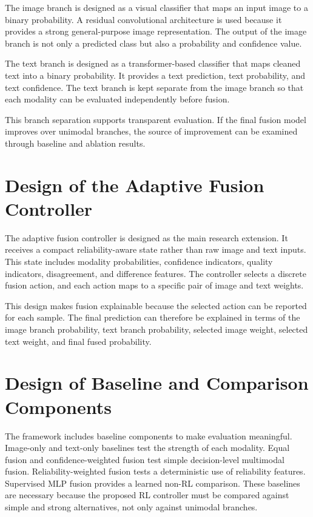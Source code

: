 The image branch is designed as a visual classifier that maps an input image to a binary probability. A residual convolutional architecture is used because it provides a strong general-purpose image representation. The output of the image branch is not only a predicted class but also a probability and confidence value.


The text branch is designed as a transformer-based classifier that maps cleaned text into a binary probability. It provides a text prediction, text probability, and text confidence. The text branch is kept separate from the image branch so that each modality can be evaluated independently before fusion.


This branch separation supports transparent evaluation. If the final fusion model improves over unimodal branches, the source of improvement can be examined through baseline and ablation results.


\section{Design of the Adaptive Fusion Controller}


The adaptive fusion controller is designed as the main research extension. It receives a compact reliability-aware state rather than raw image and text inputs. This state includes modality probabilities, confidence indicators, quality indicators, disagreement, and difference features. The controller selects a discrete fusion action, and each action maps to a specific pair of image and text weights.


This design makes fusion explainable because the selected action can be reported for each sample. The final prediction can therefore be explained in terms of the image branch probability, text branch probability, selected image weight, selected text weight, and final fused probability.


\section{Design of Baseline and Comparison Components}


The framework includes baseline components to make evaluation meaningful. Image-only and text-only baselines test the strength of each modality. Equal fusion and confidence-weighted fusion test simple decision-level multimodal fusion. Reliability-weighted fusion tests a deterministic use of reliability features. Supervised MLP fusion provides a learned non-RL comparison. These baselines are necessary because the proposed RL controller must be compared against simple and strong alternatives, not only against unimodal branches.


